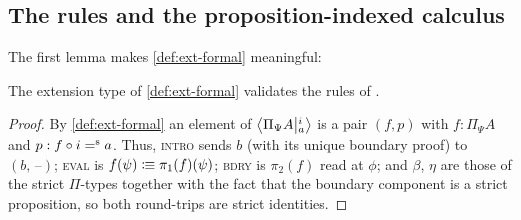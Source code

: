 


\subsection{The rules and the proposition-indexed calculus}

The first lemma makes \cref{def:ext-formal} meaningful:

\begin{lemma}\label{lem:rs-rules}
	The extension type of \cref{def:ext-formal} validates the rules of
	\citet[Fig.~4]{RS2017}.
\end{lemma}
\begin{proof}
	By \cref{def:ext-formal} an element of $\Ext{i}{\Pi_\Psi A}{a}$ is a pair $(f,p)$
	with $f:\Pi_\Psi A$ and $p: f\circ i\seq a$. Thus, \textsc{intro} sends $b$ (with its unique boundary proof) to
	$(b,\,\text{--})$; \textsc{eval} is $f(\psi)\colonequiv\pi_1(f)(\psi)$;
	\textsc{bdry} is $\pi_2(f)$ read at $\phi$; and $\beta$, $\eta$ are those of the
	strict $\Pi$-types together with the fact that the boundary component is a strict proposition, so both round-trips are strict
	identities.
\end{proof}


